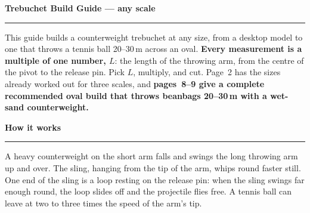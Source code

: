 \documentclass[11pt,a4paper]{article}
\newcommand{\sechead}[1]{%
  \par\vspace{6pt}%
  {\bfseries\large\color{HeadGrey} #1}\\[-4pt]
  {\color{RuleGrey}\rule{\linewidth}{0.8pt}}\par\vspace{1pt}
}
\begin{document}
\small

{\LARGE\bfseries\color{Ink} Trebuchet Build Guide --- any scale}\\[3pt]
{\color{RuleGrey}\rule{\linewidth}{1.2pt}}

This guide builds a counterweight trebuchet at any size, from a desktop model to one that throws a tennis ball 20--30\,m across an oval. \textbf{Every measurement is a multiple of one number, $L$}: the length of the throwing arm, from the centre of the pivot to the release pin. Pick $L$, multiply, and cut. Page~2 has the sizes already worked out for three scales, and \textbf{pages~8--9 give a complete recommended oval build that throws beanbags 20--30\,m with a wet-sand counterweight.}

\sechead{How it works}
A heavy counterweight on the short arm falls and swings the long throwing arm up and over. The sling, hanging from the tip of the arm, whips round faster still. One end of the sling is a loop resting on the release pin: when the sling swings far enough round, the loop slides off and the projectile flies free. A tennis ball can leave at two to three times the speed of the arm's tip.
\end{document}
